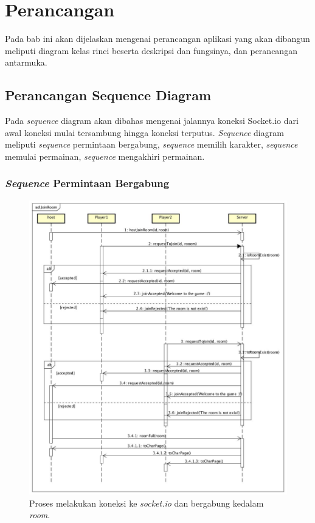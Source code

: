 \chapter{Perancangan}
\label{chap:perancangan}

Pada bab ini akan dijelaskan mengenai perancangan aplikasi yang akan dibangun meliputi diagram kelas rinci beserta deskripsi dan fungsinya, dan perancangan antarmuka.

\section{Perancangan Sequence Diagram}

Pada \textit{sequence} diagram akan dibahas mengenai jalannya koneksi Socket.io dari awal koneksi mulai tersambung hingga koneksi terputus. \textit{Sequence} diagram meliputi \textit{sequence} permintaan bergabung, \textit{sequence} memilih karakter, \textit{sequence} memulai permainan, \textit{sequence} mengakhiri permainan.

\subsection{\textit{Sequence} Permintaan Bergabung}

\begin{figure}[H]
	\centering
	\includegraphics[scale=0.25]{Gambar/JoinRoom}
	\caption{Proses melakukan koneksi ke \textit{socket.io} dan bergabung kedalam \textit{room}.}
	\label{fig:1_JoinRoom}
\end{figure}

